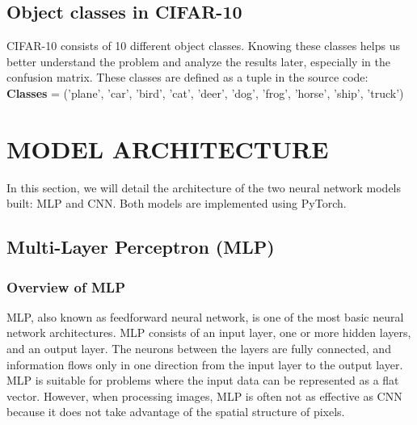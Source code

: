 \documentclass[12pt]{article}
\begin{document}
\subsection{Object classes in CIFAR-10}
CIFAR-10 consists of 10 different object classes. Knowing these classes helps us better understand the problem and analyze the results later, especially in the confusion matrix. These classes are defined as a tuple in the source code: \\
\textbf{Classes} = ('plane', 'car', 'bird', 'cat', 'deer', 'dog', 'frog', 'horse', 'ship', 'truck')

\section{MODEL ARCHITECTURE}
In this section, we will detail the architecture of the two neural network models built: MLP and CNN. Both models are implemented using PyTorch.

\subsection{Multi-Layer Perceptron (MLP)}
\subsubsection{Overview of MLP}
MLP, also known as feedforward neural network, is one of the most basic neural network architectures. MLP consists of an input layer, one or more hidden layers, and an output layer. The neurons between the layers are fully connected, and information flows only in one direction from the input layer to the output layer. MLP is suitable for problems where the input data can be represented as a flat vector. However, when processing images, MLP is often not as effective as CNN because it does not take advantage of the spatial structure of pixels.
\end{document}
